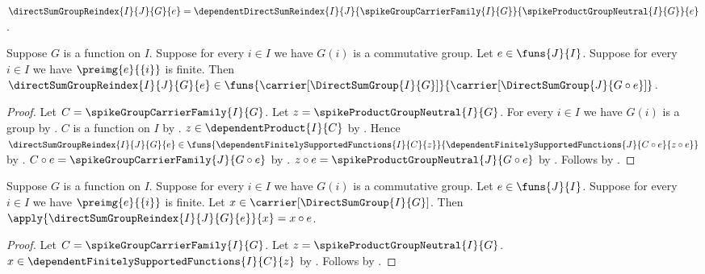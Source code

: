 \begin{definition}\label{spike_direct_sum_group_reindex}
    $\directSumGroupReindex{I}{J}{G}{e}
        =\dependentDirectSumReindex
            {I}{J}{\spikeGroupCarrierFamily{I}{G}}{
                \spikeProductGroupNeutral{I}{G}}{e}$.
\end{definition}

\begin{proposition}\label{spike_direct_sum_group_reindex_type}
    Suppose $G$ is a function on $I$.
    Suppose for every $i\in I$ we have $G(i)$ is a commutative group.
    Let $e\in\funs{J}{I}$.
    Suppose for every $i\in I$ we have
        $\preimg{e}{\{i\}}$ is finite.
    Then
        $\directSumGroupReindex{I}{J}{G}{e}\in
            \funs{\carrier[\DirectSumGroup{I}{G}]}{
                \carrier[\DirectSumGroup{J}{G\circ e}]}$.
\end{proposition}
\begin{proof}
    Let $C=\spikeGroupCarrierFamily{I}{G}$.
    Let $z=\spikeProductGroupNeutral{I}{G}$.
    For every $i\in I$ we have $G(i)$ is a group by
        .
    $C$ is a function on $I$ by
        .
    $z\in\dependentProduct{I}{C}$ by
        .
    Hence
        $\directSumGroupReindex{I}{J}{G}{e}\in
            \funs{
                \dependentFinitelySupportedFunctions{I}{C}{z}}{
                \dependentFinitelySupportedFunctions
                    {J}{C\circ e}{z\circ e}}$ by
        .
    $C\circ e=\spikeGroupCarrierFamily{J}{G\circ e}$ by
        .
    $z\circ e=\spikeProductGroupNeutral{J}{G\circ e}$ by
        .
    Follows by
        .
\end{proof}

\begin{proposition}\label{spike_direct_sum_group_reindex_apply}
    Suppose $G$ is a function on $I$.
    Suppose for every $i\in I$ we have $G(i)$ is a commutative group.
    Let $e\in\funs{J}{I}$.
    Suppose for every $i\in I$ we have
        $\preimg{e}{\{i\}}$ is finite.
    Let $x\in\carrier[\DirectSumGroup{I}{G}]$.
    Then $\apply{\directSumGroupReindex{I}{J}{G}{e}}{x}=x\circ e$.
\end{proposition}
\begin{proof}
    Let $C=\spikeGroupCarrierFamily{I}{G}$.
    Let $z=\spikeProductGroupNeutral{I}{G}$.
    $x\in\dependentFinitelySupportedFunctions{I}{C}{z}$ by
        .
    Follows by
        .
\end{proof}

